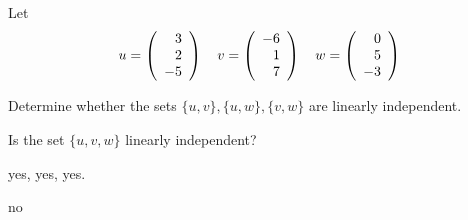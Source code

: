 \documentclass{ximera}
\begin{document}


\problemlabel

\begin{exercise}\label{C5.4.10}
 Let 
 \[
 u = \left(\begin{array}{rrrrrrrrrrrrrrrrrr} 3\\2\\-5 \end{array}\right) \quad v = \left(\begin{array}{rrrrrrrrrrrrrrrrrr} -6\\1\\7 \end{array}\right) \quad w = \left(\begin{array}{rrrrrrrrrrrrrrrrrr} 0\\5\\-3 \end{array}\right)
 \]
\begin{enumeratea}
\item Determine whether the sets $\{u,v\}, \{u,w\}, \{v,w\}$ are linearly independent.
\item Is the set $\{u,v,w\}$ linearly independent? 
\end{enumeratea}

  
\begin{solution}

\ans %
\begin{enumeratea}
\item yes, yes, yes.
\item no
\end{enumeratea}

\soln %


\end{solution}
\end{exercise}
\end{document}
